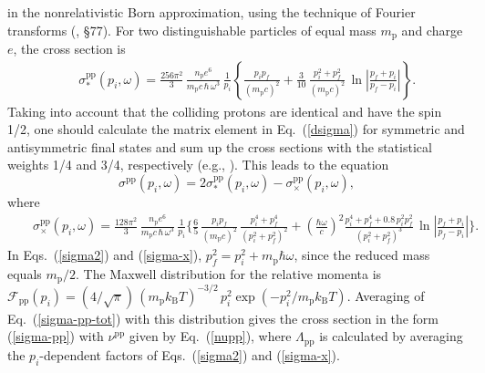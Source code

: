 \documentclass{emulateapj}
\newcommand{\beq}{\begin{equation}}
\newcommand{\eeq}{\end{equation}}
\newcommand{\bea}{\begin{eqnarray}}
\newcommand{\eea}{\end{eqnarray}}
\newcommand{\req}[1]{Eq.\ (\ref{#1})}
\newcommand{\mpr}{m_\mathrm{p}}
\newcommand{\kB}{k_\mathrm{B}}
\begin{document}
\begin{appendix}
in the nonrelativistic Born approximation,
using the technique of Fourier transforms 
(\citealp{BetheSalpeter}, \S77).
For two distinguishable particles of equal 
mass $\mpr$ and charge $e$, the cross section is
\bea&&
   \sigma_\ast^\mathrm{pp}(p_i,\omega) = \frac{256\pi^2}{3}\,
   \frac{n_\mathrm{p} e^6}{\mpr c \,\hbar\,\omega^3}\,
   \frac{1}{p_i}\left\{ \frac{p_i p_f}{(\mpr c)^2}
   + \frac{3}{10}\,\frac{p_i^2+p_f^2}{(\mpr c)^2}\,
   \ln\left|\frac{p_f+p_i}{p_f-p_i}\right| \right\}.
\label{sigma2}
\eea
Taking into account that the colliding protons are identical
and have the spin 1/2,
one should calculate the matrix element in \req{dsigma}
for symmetric and antisymmetric final states
and sum up the cross sections with the statistical weights
1/4 and 3/4, respectively (e.g., 
\citealp{LaLi-QM}). This leads to the equation
\beq
 \sigma^\mathrm{pp}(p_i,\omega) = 2\sigma_\ast^\mathrm{pp}(p_i,\omega)
       - \sigma_\times^\mathrm{pp}(p_i,\omega),
\label{sigma-pp-tot}
\eeq
where
\bea
&&
   \sigma_\times^\mathrm{pp}(p_i,\omega) = \frac{128\pi^2}{3}\,
   \frac{n_\mathrm{p} e^6}{\mpr c \,\hbar\,\omega^3}\,
   \frac{1}{p_i}\bigg\{ 
     \frac65\,\frac{p_i p_f}{(\mpr c)^2}\,
     \frac{p_i^4+p_f^4}{(p_i^2+p_f^2)^2}
     + \left(\frac{\hbar\omega}{c}\right)^2
     \frac{p_i^4+p_f^4+0.8\,p_i^2 p_f^2}{(p_i^2 + p_f^2)^3}\,
     \ln\left|\frac{p_f+p_i}{p_f-p_i}\right| \bigg\}.
\label{sigma-x}
\eea
In Eqs.\ (\ref{sigma2}) and (\ref{sigma-x}), $p_f^2=p_i^2+\mpr\hbar\omega$, 
since the reduced mass equals $\mpr/2$. 
The Maxwell distribution for the relative momenta is
$\mathcal{F}_\mathrm{pp}(p_i)=(4/\sqrt{\pi})\,(\mpr \kB T)^{-3/2}\,
p_i^2\exp(-p_i^2/\mpr\kB T)$. Averaging of \req{sigma-pp-tot}
with this distribution gives
the cross section in the form (\ref{sigma-pp}) with
$\nu^\mathrm{pp}$ given by \req{nupp},
where $\Lambda_\mathrm{pp}$ is 
calculated by averaging the $p_i$-dependent factors of
Eqs.\ (\ref{sigma2}) and (\ref{sigma-x}). 


\end{appendix}
\end{document}
